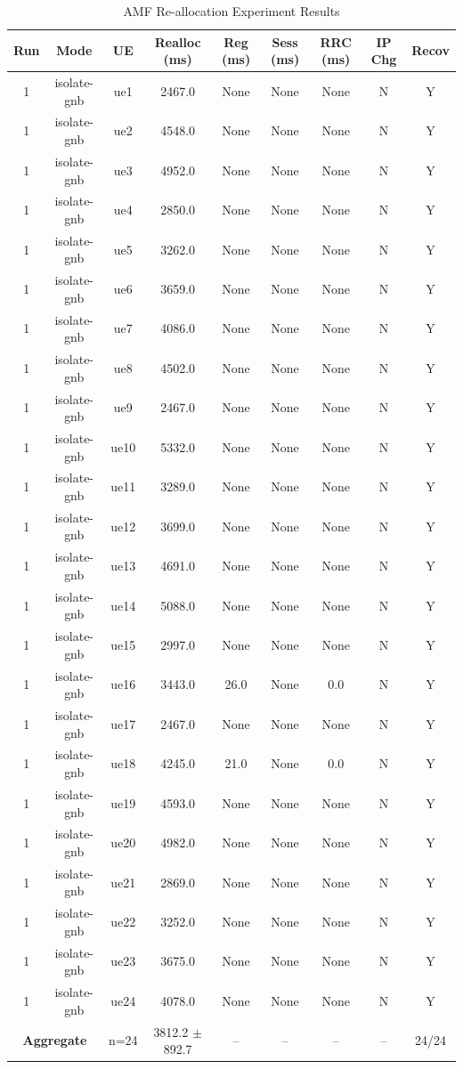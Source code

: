 \begin{table}[ht]
\centering
\begin{tabular}{|c|c|c|c|c|c|c|c|c|}
\hline
Run & Mode & UE & Realloc (ms) & Reg (ms) & Sess (ms) & RRC (ms) & IP Chg & Recov \\
\hline
1 & isolate-gnb & ue1 & 2467.0 & None & None & None & N & Y \\
1 & isolate-gnb & ue2 & 4548.0 & None & None & None & N & Y \\
1 & isolate-gnb & ue3 & 4952.0 & None & None & None & N & Y \\
1 & isolate-gnb & ue4 & 2850.0 & None & None & None & N & Y \\
1 & isolate-gnb & ue5 & 3262.0 & None & None & None & N & Y \\
1 & isolate-gnb & ue6 & 3659.0 & None & None & None & N & Y \\
1 & isolate-gnb & ue7 & 4086.0 & None & None & None & N & Y \\
1 & isolate-gnb & ue8 & 4502.0 & None & None & None & N & Y \\
1 & isolate-gnb & ue9 & 2467.0 & None & None & None & N & Y \\
1 & isolate-gnb & ue10 & 5332.0 & None & None & None & N & Y \\
1 & isolate-gnb & ue11 & 3289.0 & None & None & None & N & Y \\
1 & isolate-gnb & ue12 & 3699.0 & None & None & None & N & Y \\
1 & isolate-gnb & ue13 & 4691.0 & None & None & None & N & Y \\
1 & isolate-gnb & ue14 & 5088.0 & None & None & None & N & Y \\
1 & isolate-gnb & ue15 & 2997.0 & None & None & None & N & Y \\
1 & isolate-gnb & ue16 & 3443.0 & 26.0 & None & 0.0 & N & Y \\
1 & isolate-gnb & ue17 & 2467.0 & None & None & None & N & Y \\
1 & isolate-gnb & ue18 & 4245.0 & 21.0 & None & 0.0 & N & Y \\
1 & isolate-gnb & ue19 & 4593.0 & None & None & None & N & Y \\
1 & isolate-gnb & ue20 & 4982.0 & None & None & None & N & Y \\
1 & isolate-gnb & ue21 & 2869.0 & None & None & None & N & Y \\
1 & isolate-gnb & ue22 & 3252.0 & None & None & None & N & Y \\
1 & isolate-gnb & ue23 & 3675.0 & None & None & None & N & Y \\
1 & isolate-gnb & ue24 & 4078.0 & None & None & None & N & Y \\
\multicolumn{2}{|c|}{\textbf{Aggregate}} & n=24 & 3812.2 $\pm$ 892.7 & -- & -- & -- & -- & 24/24 \\
\hline
\end{tabular}
\caption{AMF Re-allocation Experiment Results}
\label{tab:amf_realloc}
\end{table}
